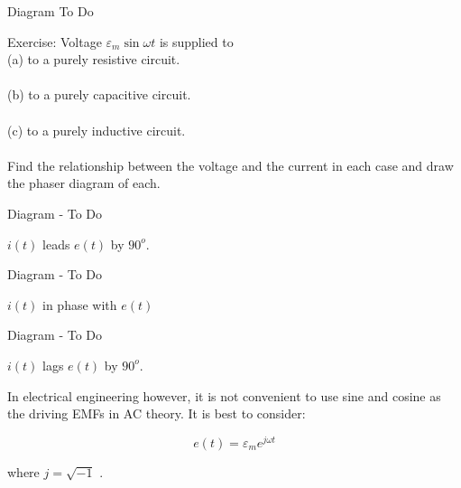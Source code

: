 \documentclass[a4paper,12pt]{article}
\begin{document}
\begin{table}[hbtp]

Diagram To Do

\end{table}

Exercise: Voltage $\varepsilon_{m} \sin{\omega t}$ is supplied to \\

(a) to a purely resistive circuit. \\ \\

(b) to a purely capacitive circuit. \\ \\

(c) to a purely inductive circuit. \\ \\

Find the relationship between the voltage and the current in each case
and draw the phaser diagram of each.


\begin{table}[hbtp]

Diagram - To Do

\end{table}

\begin{table}[hbtp]

$i(t)$ leads $e(t)$ by $90^{o}$.

\end{table}

\begin{table}[hbtp]

Diagram - To Do

\end{table}

$i(t)$ in phase with $e(t)$

\begin{table}[hbtp]

Diagram - To Do

\end{table}

$i(t)$ lags $e(t)$ by $90^{o}$.

In electrical engineering however, it is not convenient to use sine and
cosine as the driving EMFs in AC theory. It is best to consider:

\[ e(t) = \varepsilon_{m} e^{j \omega t} \]

where $j = \sqrt{-1}$ . \\
\end{document}
